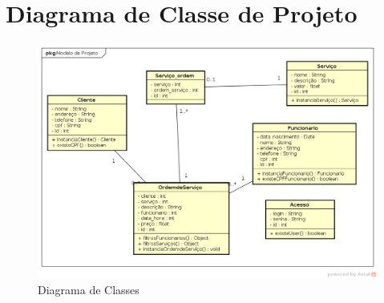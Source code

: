 \documentclass[
	12pt,				%
	openright,
	oneside,			%
	a4paper,			%
	chapter=TITLE,		%
	brazil				%
	]{abntex2}
\begin{document}

\frenchspacing 


\imprimirfolhaderosto

\tableofcontents*
\cleardoublepage


\textual


\listoffigures*
\cleardoublepage

\chapter{Diagrama de Classe de Projeto}

\begin{figure}[h!]
	\caption{Diagrama de Classes}
	\begin{center}
	    \includegraphics[scale=0.5]{Arquivos/diagrama_classes}  
	\end{center}
\end{figure}
\end{document}
